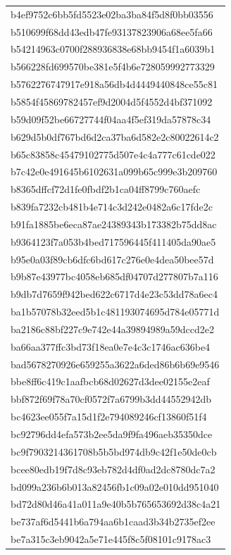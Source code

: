 \begin{tabular}{l}
b4ef9752c6bb5fd5523e02ba3ba84f5d8f0bb03556 \\
b510699f68dd43edb47fe93137823906a68ee5fa66 \\
b54214963c0700f288936838e68bb9454f1a6039b1 \\
b566228fd699570be381e5f4b6e728059992773329 \\
b5762276747917e918a56db4d4449440848ce55c81 \\
b5854f45869782457ef9d2004d5f4552d4bf371092 \\
b59d09f52be66727744f04aa4f5ef319da57878c34 \\
b629d5b0df767bd6d2ca37ba6d582e2c80022614c2 \\
b65c83858c45479102775d507e4c4a777c61cde022 \\
b7c42e0e491645b6102631a099b65c999e3b209760 \\
b8365dffcf72d1fe0fbdf2b1ca04ff8799c760aefc \\
b839fa7232cb481b4e714c3d242e0482a6c17fde2c \\
b91fa1885be6eca87ae24389343b173382b75dd8ac \\
b9364123f7a053b4bed717596445f411405da90ae5 \\
b95e0a03f89cb6dfc6bd617c276e0e4dea50bee57d \\
b9b87e43977bc4058eb685df04707d277807b7a116 \\
b9db7d7659f942bed622c6717d4e23c53dd78a6ec4 \\
ba1b57078b32eed5b1c481193074695d784e05771d \\
ba2186c88bf227c9e742e44a39894989a59dccd2e2 \\
ba66aa377ffc3bd73f18ea0e7e4c3c1746ac636be4 \\
bad5678270926e659255a3622a6ded86b6b69e9546 \\
bbe8ff6c419c1aafbcb68d02627d3dee02155e2eaf \\
bbf872f69f78a70cf0572f7a6799b3dd44552942db \\
bc4623ee055f7a15d1f2e794089246cf13860f51f4 \\
bc92796dd4efa573b2ee5da9f9fa496aeb35350dce \\
bc9f7903214361708b5b5bd974db9c42f1e50de0cb \\
bcee80edb19f7d8c93eb782d4df0ad2dc8780dc7a2 \\
bd099a236b6b013a82456fb1c09a02e010dd951040 \\
bd72d80d46a41a011a9e40b5b765653692d38c4a21 \\
be737af6d5441b6a794aa6b1caad3b34b2735ef2ee \\
be7a315c3eb9042a5e71e445f8c5f08101c9178ac3 \\

\end{tabular}
